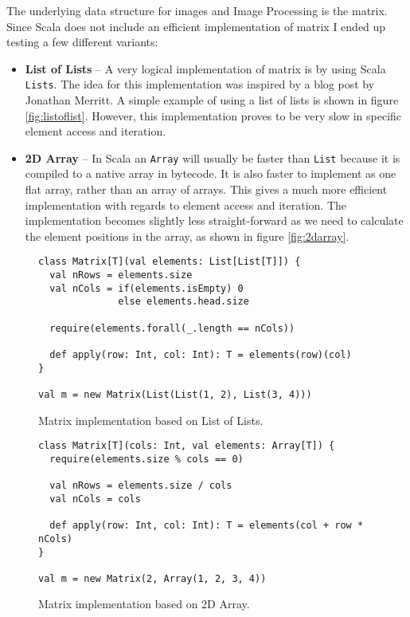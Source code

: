 \documentclass[a4paper,english]{report}
\begin{document}
The underlying data structure for images and Image Processing is the
matrix. Since Scala does not include an efficient implementation of
matrix I ended up testing a few different variants:

\begin{itemize}
\item \textbf{List of Lists} -- A very logical implementation of
  matrix is by using Scala \texttt{Lists}. The idea for this
  implementation was inspired by a blog post by Jonathan
  Merritt\cite{mer08}. A simple example of using a list of lists is
  shown in figure \vref{fig:listoflist}. However, this implementation
  proves to be very slow in specific element access and iteration.
\item \textbf{2D Array} -- In Scala an \texttt{Array} will usually be
  faster than \texttt{List} because it is compiled to a native array
  in bytecode. It is also faster to implement as one flat array,
  rather than an array of arrays. This gives a much more efficient
  implementation with regards to element access and iteration. The
  implementation becomes slightly less straight-forward as we need to
  calculate the element positions in the array, as shown in figure
  \vref{fig:2darray}.
\end{itemize}

\begin{figure}
  \begin{lstlisting}
class Matrix[T](val elements: List[List[T]]) {
  val nRows = elements.size
  val nCols = if(elements.isEmpty) 0
              else elements.head.size

  require(elements.forall(_.length == nCols))

  def apply(row: Int, col: Int): T = elements(row)(col)
}

val m = new Matrix(List(List(1, 2), List(3, 4)))
  \end{lstlisting}
  \caption{Matrix implementation based on List of
    Lists.\label{fig:listoflist}}
\end{figure}

\begin{figure}
  \begin{lstlisting}
class Matrix[T](cols: Int, val elements: Array[T]) {
  require(elements.size % cols == 0)

  val nRows = elements.size / cols
  val nCols = cols

  def apply(row: Int, col: Int): T = elements(col + row * nCols)
}

val m = new Matrix(2, Array(1, 2, 3, 4))
  \end{lstlisting}
  \caption{Matrix implementation based on 2D
    Array.\label{fig:2darray}}
\end{figure}
\end{document}
